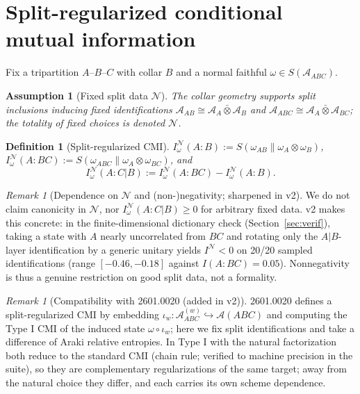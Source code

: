 \documentclass[11pt]{article}
\newtheorem{definition}[theorem]{Definition}
\newtheorem{assumption}[theorem]{Assumption}
\theoremstyle{remark}
\newtheorem{remark}[theorem]{Remark}
\begin{document}
\section{Split-regularized conditional mutual information}
Fix a tripartition $A$--$B$--$C$ with collar $B$ and a normal faithful
$\omega \in S(\mathcal{A}_{ABC})$.
\begin{assumption}[Fixed split data $\mathcal{N}$]
\label{ass:split}
The collar geometry supports split inclusions inducing fixed
identifications $\mathcal{A}_{AB} \cong \mathcal{A}_A \bar\otimes
\mathcal{A}_B$ and $\mathcal{A}_{ABC} \cong \mathcal{A}_A \bar\otimes
\mathcal{A}_{BC}$; the totality of fixed choices is denoted $\mathcal{N}$.
\end{assumption}
\begin{definition}[Split-regularized CMI]
$I^{\mathcal{N}}_\omega(A:B) := S(\omega_{AB}\|\omega_A \otimes
\omega_B)$, $I^{\mathcal{N}}_\omega(A:BC) := S(\omega_{ABC}\|\omega_A
\otimes \omega_{BC})$, and
\[
I^{\mathcal{N}}_\omega(A:C|B) := I^{\mathcal{N}}_\omega(A:BC) -
I^{\mathcal{N}}_\omega(A:B).
\]
\end{definition}
\begin{remark}[Dependence on $\mathcal{N}$ and (non-)negativity;
sharpened in v2]
\label{rem:Ndep}
We do not claim canonicity in $\mathcal{N}$, nor $I^{\mathcal{N}}_\omega
(A:C|B) \ge 0$ for arbitrary fixed data. v2 makes this concrete: in the
finite-dimensional dictionary check (Section~\ref{sec:verif}), taking a
state with $A$ nearly uncorrelated from $BC$ and rotating only the
$A|B$-layer identification by a generic unitary yields
$I^{\mathcal{N}} < 0$ on 20/20 sampled identifications (range $[-0.46,
-0.18]$ against $I(A:BC) = 0.05$). Nonnegativity is thus a genuine
restriction on good split data, not a formality.
\end{remark}
\begin{remark}[Compatibility with 2601.0020 (added in v2)]
\label{rem:compat}
2601.0020 \cite{S0020} defines a split-regularized CMI by embedding
$\iota_w: \mathcal{A}^{(w)}_{ABC} \hookrightarrow \mathcal{A}(ABC)$ and
computing the Type I CMI of the induced state $\omega \circ \iota_w$; here
we fix split identifications and take a difference of Araki relative
entropies. In Type I with the natural factorization both reduce to the
standard CMI (chain rule; verified to machine precision in the suite), so
they are complementary regularizations of the same target; away from the
natural choice they differ, and each carries its own scheme dependence.
\end{remark}
\end{document}
